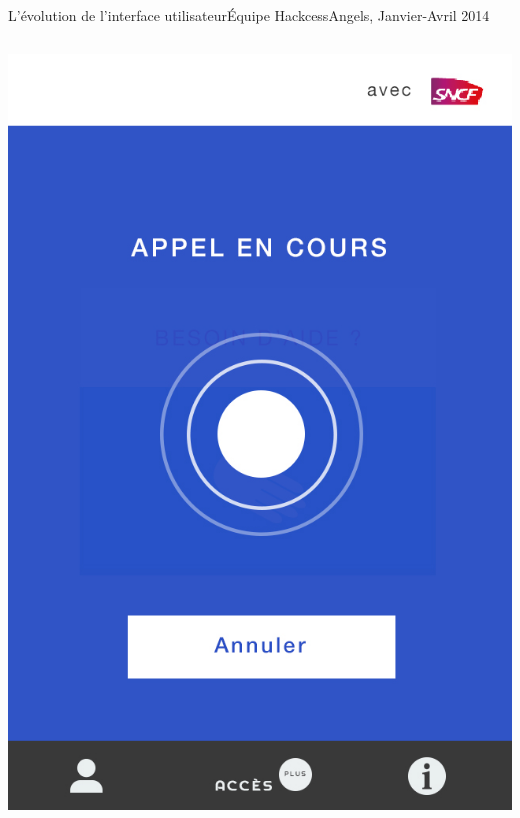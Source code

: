 \documentclass{beamer}
\begin{document}
\begin{frame}{L'évolution de l'interface utilisateur}{Équipe HackcessAngels, Janvier-Avril 2014}
\begin{columns}
\begin{column}{0.45\textwidth}
            \includegraphics[width=\textwidth]{alex-02/02-encours.jpg}
        \end{column}
    \end{columns}
\end{frame}
\end{document}
